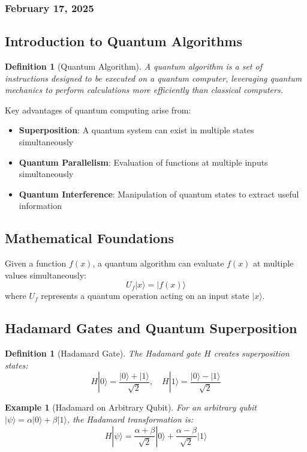 \documentclass{article}
\newtheorem{definition}[theorem]{Definition}
\newtheorem{example}[theorem]{Example}
\begin{document}
\subsubsection*{February 17, 2025}

\subsection{Introduction to Quantum Algorithms}
\begin{definition}[Quantum Algorithm]
A quantum algorithm is a set of instructions designed to be executed on a quantum computer, leveraging quantum mechanics to perform calculations more efficiently than classical computers.
\end{definition}

\begin{conceptbox}
Key advantages of quantum computing arise from:
\begin{itemize}
    \item \textbf{Superposition}: A quantum system can exist in multiple states simultaneously
    \item \textbf{Quantum Parallelism}: Evaluation of functions at multiple inputs simultaneously
    \item \textbf{Quantum Interference}: Manipulation of quantum states to extract useful information
\end{itemize}
\end{conceptbox}

\subsection{Mathematical Foundations}
Given a function \(f(x)\), a quantum algorithm can evaluate \(f(x)\) at multiple values simultaneously:
\[
U_f |x\rangle = |f(x)\rangle
\]
where \(U_f\) represents a quantum operation acting on an input state \(|x\rangle\).

\subsection{Hadamard Gates and Quantum Superposition}
\begin{definition}[Hadamard Gate]
The Hadamard gate \(H\) creates superposition states:
\[
H |0\rangle = \frac{|0\rangle + |1\rangle}{\sqrt{2}}, \quad H |1\rangle = \frac{|0\rangle - |1\rangle}{\sqrt{2}}
\]
\end{definition}

\begin{example}[Hadamard on Arbitrary Qubit]
For an arbitrary qubit \(|\psi\rangle = \alpha |0\rangle + \beta |1\rangle\), the Hadamard transformation is:
\[
H |\psi\rangle = \frac{\alpha + \beta}{\sqrt{2}} |0\rangle + \frac{\alpha - \beta}{\sqrt{2}} |1\rangle
\]
\end{example}
\end{document}
